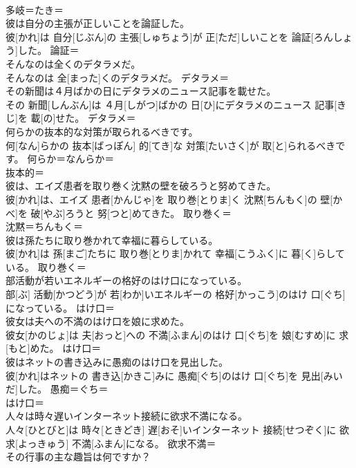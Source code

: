 \documentclass[8pt]{extreport}
\begin{document}
\begin{CJK}{UTF8}{min}
\\	多岐＝たき＝ 
\\	彼は自分の主張が正しいことを論証した。	
\\	彼[かれ]は 自分[じぶん]の 主張[しゅちょう]が 正[ただ]しいことを 論証[ろんしょう]した。	論証＝ 
\\	そんなのは全くのデタラメだ。	
\\	そんなのは 全[まった]くのデタラメだ。	デタラメ＝ 
\\	その新聞は４月ばかの日にデタラメのニュース記事を載せた。	
\\	その 新聞[しんぶん]は ４月[しがつ]ばかの 日[ひ]にデタラメのニュース 記事[きじ]を 載[の]せた。	デタラメ＝ 
\\	何らかの抜本的な対策が取られるべきです。	
\\	何[なん]らかの 抜本[ばっぽん] 的[てき]な 対策[たいさく]が 取[と]られるべきです。	何らか＝なんらか＝ 
\\	抜本的＝ 
\\	彼は、エイズ患者を取り巻く沈黙の壁を破ろうと努めてきた。	
\\	彼[かれ]は、エイズ 患者[かんじゃ]を 取り巻[とりま]く 沈黙[ちんもく]の 壁[かべ]を 破[やぶ]ろうと 努[つと]めてきた。	取り巻く＝ 
\\	沈黙＝ちんもく＝ 
\\	彼は孫たちに取り巻かれて幸福に暮らしている。	
\\	彼[かれ]は 孫[まご]たちに 取り巻[とりま]かれて 幸福[こうふく]に 暮[く]らしている。	取り巻く＝ 
\\	部活動が若いエネルギーの格好のはけ口になっている。	
\\	部[ぶ] 活動[かつどう]が 若[わか]いエネルギーの 格好[かっこう]のはけ 口[ぐち]になっている。	はけ口＝ 
\\	彼女は夫への不満のはけ口を娘に求めた。	
\\	彼女[かのじょ]は 夫[おっと]への 不満[ふまん]のはけ 口[ぐち]を 娘[むすめ]に 求[もと]めた。	はけ口＝ 
\\	彼はネットの書き込みに愚痴のはけ口を見出した。	
\\	彼[かれ]はネットの 書き込[かきこ]みに 愚痴[ぐち]のはけ 口[ぐち]を 見出[みいだ]した。	愚痴＝ぐち＝ 
\\	はけ口＝ 
\\	人々は時々遅いインターネット接続に欲求不満になる。	
\\	人々[ひとびと]は 時々[ときどき] 遅[おそ]いインターネット 接続[せつぞく]に 欲求[よっきゅう] 不満[ふまん]になる。	欲求不満＝ 
\\	その行事の主な趣旨は何ですか？	

\end{CJK}
\end{document}
